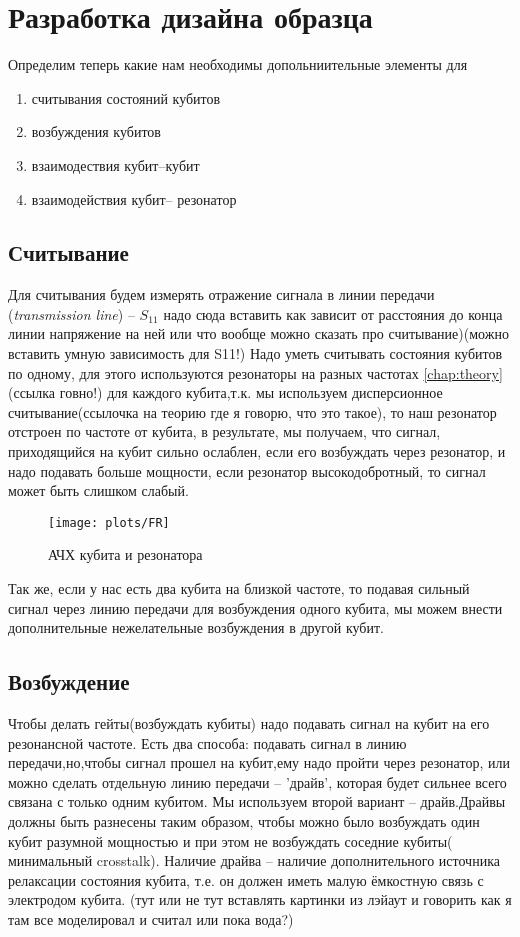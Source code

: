 \documentclass[12pt, twoside]{report}
\begin{document}
	\section{Разработка дизайна образца}
	Определим теперь какие нам необходимы допольниительные элементы для
	\begin{enumerate}
	\item считывания состояний кубитов
	\item возбуждения кубитов
	\item взаимодествия кубит--кубит
	\item взаимодействия кубит-- резонатор
	\end{enumerate}
	
		\subsection{Считывание}
Для считывания будем измерять отражение сигнала в линии передачи (\textit{transmission line}) -- $ S_{11}$
надо сюда вставить как зависит от расстояния до конца линии напряжение на ней или что вообще 
можно сказать про считывание)\cite{GlebMaster}(можно вставить умную зависимость для S11!)
Надо уметь считывать состояния кубитов по одному, для этого используются резонаторы на разных частотах \ref{chap:theory}(ссылка говно!) для каждого кубита,т.к. мы используем дисперсионное считывание(ссылочка на теорию где я говорю, что это такое), то наш резонатор отстроен по частоте от кубита, в результате, мы получаем, что сигнал, приходящийся на кубит сильно ослаблен, если его возбуждать через резонатор, и надо подавать больше мощности, если резонатор высокодобротный, то сигнал может быть слишком слабый.
	\begin{figure}[h]
		\begin{center}
\texttt{[image: plots/FR]}
\caption{АЧХ кубита и резонатора}
		\end{center}
	\end{figure}
Так же, если у нас есть два кубита на близкой частоте, то подавая сильный сигнал через линию передачи для возбуждения одного кубита, мы можем внести дополнительные нежелательные возбуждения в другой кубит.
		
		\subsection{Возбуждение}
Чтобы делать гейты(возбуждать кубиты) надо подавать сигнал на кубит на его резонансной частоте. Есть два способа: подавать сигнал в линию передачи,но,чтобы сигнал прошел на кубит,ему надо пройти через резонатор, или 
можно сделать отдельную линию передачи -- 'драйв', которая будет сильнее всего связана с только одним кубитом. Мы используем второй вариант -- драйв.Драйвы должны быть разнесены таким образом, чтобы можно было возбуждать один кубит разумной мощностью и при этом не возбуждать соседние кубиты( минимальный crosstalk). Наличие драйва -- наличие дополнительного источника релаксации состояния кубита, т.е. он должен иметь малую ёмкостную связь с электродом кубита.
(тут или не тут вставлять картинки из лэйаут и говорить как я там все моделировал и считал или пока вода?)
 		
\end{document}
